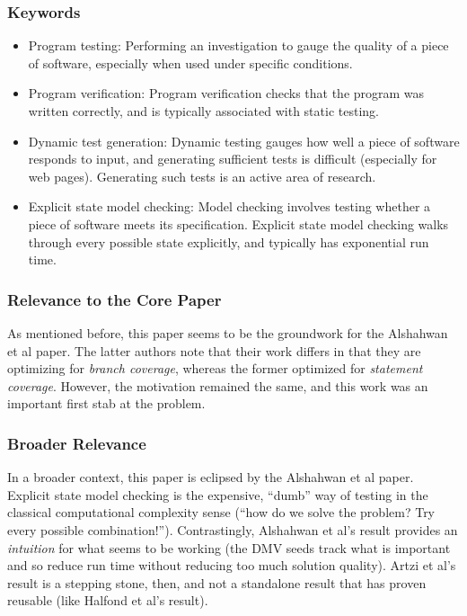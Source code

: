 \documentclass{sig-alternate-05-2015}
\begin{document}
\subsubsection{Keywords}
\begin{itemize}
\item Program testing: Performing an investigation to gauge the quality of a piece of software, especially when used under specific conditions.
\item Program verification: Program verification checks that the program was written correctly, and is typically associated with static testing.
\item Dynamic test generation: Dynamic testing gauges how well a piece of software responds to input, and generating sufficient tests is difficult (especially for web pages). Generating such tests is an active area of research.
\item Explicit state model checking: Model checking involves testing whether a piece of software meets its specification. Explicit state model checking walks through every possible state explicitly, and typically has exponential run time.
\end{itemize}

\subsubsection{Relevance to the Core Paper}
As mentioned before, this paper seems to be the groundwork for the Alshahwan et al paper. The latter authors note that their work differs in that they are optimizing for \emph{branch coverage}, whereas the former optimized for \emph{statement coverage}. However, the motivation remained the same, and this work was an important first stab at the problem. 

\subsubsection{Broader Relevance}
In a broader context, this paper is eclipsed by the Alshahwan et al paper. Explicit state model checking is the expensive, ``dumb'' way of testing in the classical computational complexity sense (``how do we solve the problem? Try every possible combination!''). Contrastingly, Alshahwan et al's result provides an \emph{intuition} for what seems to be working (the DMV seeds track what is important and so reduce run time without reducing too much solution quality). Artzi et al's result is a stepping stone, then, and not a standalone result that has proven reusable (like Halfond et al's result). 
\end{document}
